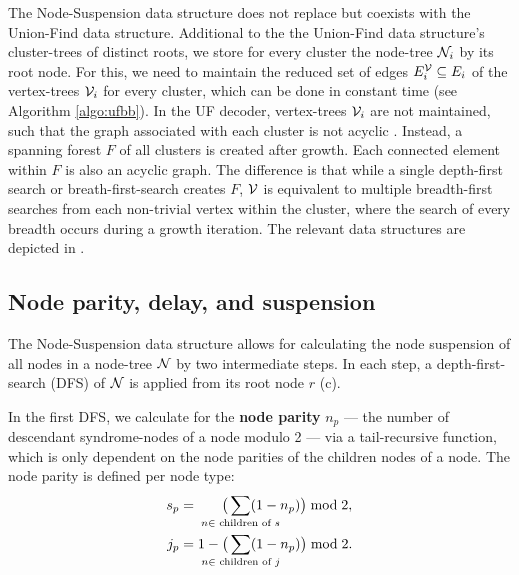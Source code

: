The Node-Suspension data structure does not replace but coexists with the Union-Find data structure. Additional to the the Union-Find data structure's cluster-trees of distinct roots, we store for every cluster the node-tree $\mathcal{N}_i$ by its root node. For this, we need to maintain the reduced set of edges $E^{\mathcal{V}}_i \subseteq E_i$ of the vertex-trees $\mathcal{V}_i$ for every cluster, which can be done in constant time (see Algorithm \ref{algo:ufbb}). In the UF decoder, vertex-trees $\mathcal{V}_i$ are not maintained, such that the graph associated with each cluster is not acyclic \cite{delfosse2017almost}. Instead, a spanning forest $F$ of all clusters is created \cite{delfosse2017linear} after growth. Each connected element within $F$ is also an acyclic graph. The difference is that while a single depth-first search or breath-first-search creates $F$, $\mathcal{V}$ is equivalent to multiple breadth-first searches from each non-trivial vertex within the cluster, where the search of every breadth occurs during a growth iteration. The relevant data structures are depicted in . 


\subsection{Node parity, delay, and suspension}\label{sec:paritydelaysus}

The Node-Suspension data structure allows for calculating the node suspension of all nodes in a node-tree $\mathcal{N}$ by two intermediate steps. In each step, a depth-first-search (DFS) of $\mathcal{N}$ is applied from its root node $r$ (c).

In the first DFS, we calculate for the \textbf{node parity} $n_p$ --- the number of descendant syndrome-nodes of a node modulo 2 --- via a tail-recursive function, which is only dependent on the node parities of the children nodes of a node. The node parity is defined per node type:
\begin{align}\label{eq:nodeparity}
    s_p &= \hspace{.6cm}\big( \sum_{\mathclap{n \in \text{ children of } s}} (1-n_p) \big ) \bmod 2,\\
    j_p &= 1 - \big(\sum_{\mathclap{n \in \text{ children of } j}} (1-n_p) \big) \bmod 2.
\end{align}

